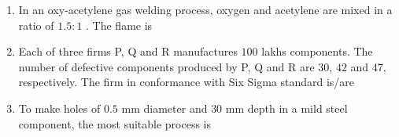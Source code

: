 \documentclass[journal,12pt,onecolumn]{IEEEtran}
\theoremstyle{remark}
\begin{document}
\begin{enumerate}
\begin{enumerate}
\end{enumerate}

\item In an oxy-acetylene gas welding process, oxygen and acetylene are mixed in a ratio of $1.5:1$ . The flame is

\hfill{}

\begin{enumerate}
\end{enumerate}

\item Each of three firms P, Q and R manufactures $100$ lakhs components. The number of defective components produced by P, Q and R are $30$, $42$ and $47$, respectively. The firm in conformance with Six Sigma standard is/are

\hfill{}

\begin{enumerate}
\end{enumerate}

\item To make holes of $0.5$ mm diameter and $30$ mm depth in a mild steel component, the most suitable process is

\hfill{}

\begin{enumerate}
\end{enumerate}


\end{enumerate}
\end{document}
